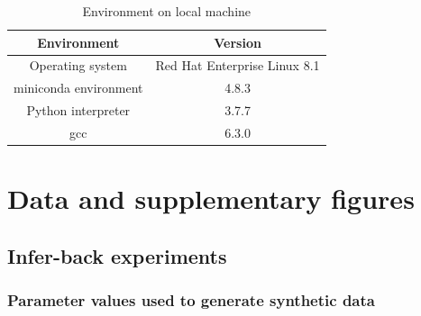 \begin{table}[H]
    \centering
    \begin{tabular}{|c c|}
        \hline
        Environment           & Version                      \\ [0.5ex]
        \hline\hline
        Operating system      & Red Hat Enterprise Linux 8.1 \\
        miniconda environment & 4.8.3                        \\
        Python interpreter    & 3.7.7                        \\
        gcc                   & 6.3.0                        \\
        \hline
    \end{tabular}
    \caption{Environment on local machine}
    \label{table:cirrus_soft}
\end{table}


\chapter{Data and supplementary figures}






\section{Infer-back experiments}

\subsection{Parameter values used to generate synthetic data}

